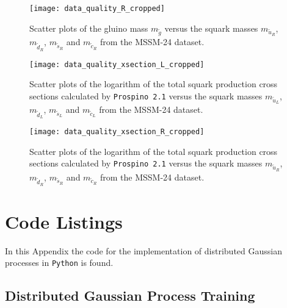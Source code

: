 \documentclass[twoside,english]{uiofysmaster}
\begin{document}
{{\begin{appendices}
\begin{figure}[H]
    \centering
        \texttt{[image: data\_quality\_R\_cropped]}
    \caption[Data quality $m_{\tilde{g}}$ versus $m_{\widetilde{u}_R}$, $m_{\widetilde{d}_R}$, $m_{\widetilde{s}_R}$ and $m_{\widetilde{c}_R}$]{Scatter plots of the gluino mass $m_{\tilde{g}}$ versus the squark masses $m_{\widetilde{u}_R}$, $m_{\widetilde{d}_R}$, $m_{\widetilde{s}_R}$ and $m_{\widetilde{c}_R}$ from the MSSM-24 dataset.}
\label{Fig:: App : Data quality plots}
\end{figure}

\begin{figure}[H]
    \centering
        \texttt{[image: data\_quality\_xsection\_L\_cropped]}
    \caption[Data quality $\sigma$ versus $m_{\widetilde{u}_L}$, $m_{\widetilde{d}_L}$, $m_{\widetilde{s}_L}$ and $m_{\widetilde{c}_L}$]{Scatter plots of the logarithm of the total squark production cross sections calculated by {\tt Prospino 2.1} versus the squark masses $m_{\widetilde{u}_L}$, $m_{\widetilde{d}_L}$, $m_{\widetilde{s}_L}$ and $m_{\widetilde{c}_L}$ from the MSSM-24 dataset.}
\label{Fig:: App : Data quality xsection plots}
\end{figure}

\begin{figure}[H]
    \centering
        \texttt{[image: data\_quality\_xsection\_R\_cropped]}
    \caption[Data quality $\sigma$ versus $m_{\widetilde{u}_R}$, $m_{\widetilde{d}_R}$, $m_{\widetilde{s}_R}$ and $m_{\widetilde{c}_R}$]{Scatter plots of the logarithm of the total squark production cross sections calculated by {\tt Prospino 2.1} versus the squark masses $m_{\widetilde{u}_R}$, $m_{\widetilde{d}_R}$, $m_{\widetilde{s}_R}$ and $m_{\widetilde{c}_R}$ from the MSSM-24 dataset.}
\label{Fig:: App : Data quality xsection plots}
\end{figure}


\chapter{Code Listings}\label{App::Code listings}

In this Appendix the code for the implementation of distributed Gaussian processes in \verb|Python| is found. 

\section{Distributed Gaussian Process Training}\label{App:Distributed Gaussian Process Training}


\end{appendices}}}
\end{document}
